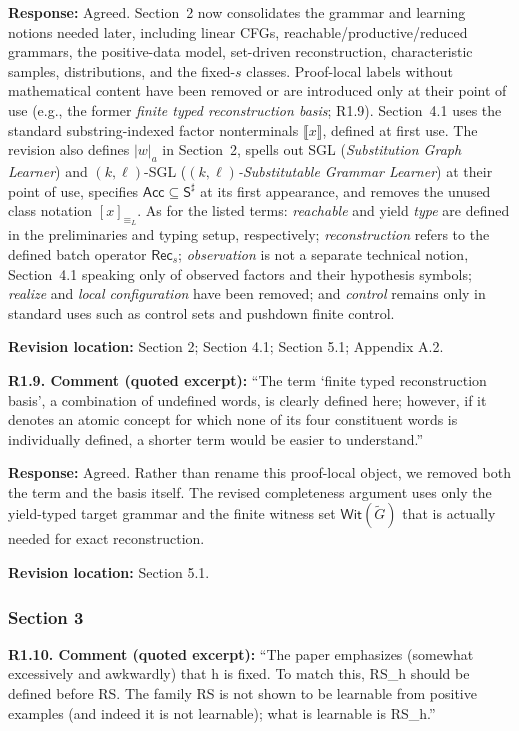 \documentclass[
  10pt,
  a4paper,
]{article}
\newcommand{\NT}[1]{\llbracket #1\rrbracket}
\begin{document}
\textbf{Response:} Agreed. Section~2 now consolidates the grammar and
learning notions needed later, including linear CFGs,
reachable/productive/reduced grammars, the positive-data model,
set-driven reconstruction, characteristic samples, distributions, and the
fixed-\(s\) classes. Proof-local labels without mathematical content have
been removed or are introduced only at their point of use (e.g., the former
\emph{finite typed reconstruction basis}; R1.9). Section~4.1 uses the
standard substring-indexed factor nonterminals $\NT{x}$, defined at first
use. The revision also defines $|w|_a$ in Section~2, spells out SGL
(\emph{Substitution Graph Learner}) and $(k,\ell)$-SGL
(\emph{$(k,\ell)$-Substitutable Grammar Learner}) at their point of use,
specifies $\mathsf{Acc}\subseteq\mathsf S^\sharp$ at its first appearance, and removes the
unused class notation $[x]_{\equiv_L}$. As for the listed terms:
\emph{reachable} and yield \emph{type} are defined in the preliminaries and
typing setup, respectively; \emph{reconstruction} refers to the defined
batch operator $\mathsf{Rec}_s$; \emph{observation} is not a separate
technical notion, Section~4.1 speaking only of observed factors and their
hypothesis symbols; \emph{realize} and \emph{local configuration} have been
removed; and \emph{control} remains only in standard uses such as control
sets and pushdown finite control.

\textbf{Revision location:} Section 2; Section 4.1; Section 5.1; Appendix A.2.


\textbf{R1.9. Comment (quoted excerpt):} ``The term `finite typed
reconstruction basis', a combination of undefined words, is clearly
defined here; however, if it denotes an atomic concept for which none of
its four constituent words is individually defined, a shorter term would
be easier to understand.''

\textbf{Response:} Agreed. Rather than rename this proof-local object,
we removed both the term and the basis itself. The revised completeness
argument uses only the yield-typed target grammar and the finite witness
set \(\mathsf{Wit}(\widetilde G)\) that is actually needed for exact
reconstruction.

\textbf{Revision location:} Section 5.1.


\subsubsection{Section 3}\label{section-3}

\textbf{R1.10. Comment (quoted excerpt):} ``The paper emphasizes (somewhat
excessively and awkwardly) that h is fixed. To match this, RS\_h should
be defined before RS. The family RS is not shown to be learnable from
positive examples (and indeed it is not learnable); what is learnable is
RS\_h.''
\end{document}
